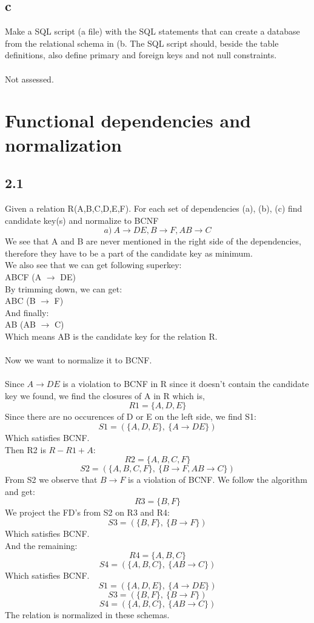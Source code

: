 \documentclass[12pt]{article}
\begin{document}
\subsection*{c}
Make a SQL script (a file) with the SQL statements that can create a database from the relational schema in (b. The SQL script should, beside the table definitions, also define primary and foreign keys and not null constraints.\\
\\
Not assessed.

\section*{Functional dependencies and normalization}
\subsection*{2.1}
Given a relation R(A,B,C,D,E,F). For each set of dependencies (a), (b), (c) find candidate key(s) and normalize to BCNF
$$a)\: A\rightarrow DE, B\rightarrow F, AB\rightarrow C$$
We see that A and B are never mentioned in the right side of the dependencies, therefore they have to be a part of the candidate key as minimum.\\
We also see that we can get following superkey:\\
ABCF (A $\rightarrow$ DE)\\
By trimming down, we can get:\\
ABC (B $\rightarrow$ F)\\
And finally:\\
AB (AB $\rightarrow$ C)\\
Which means AB is the candidate key for the relation R.\\
\\
Now we want to normalize it to BCNF.\\
\\
Since $A\rightarrow DE$ is a violation to BCNF in R since it doesn't contain the candidate key we found, we find the closures of A in R which is,
$$R1=\{A,D,E\}$$
Since there are no occurences of D or E on the left side, we find S1:
$$S1=(\{A,D,E\},\:\{A \rightarrow DE\})$$
Which satisfies BCNF.\\
Then R2 is $R-R1+{A}$:
$$R2=\{A,B,C,F\}$$
$$S2=(\{A,B,C,F\},\:\{B\rightarrow F, AB\rightarrow C\})$$
From S2 we observe that $B\rightarrow F$ is a violation of BCNF. We follow the algorithm and get:
$$R3=\{B,F\}$$
We project the FD's from S2 on R3 and R4:
$$S3=(\{B,F\},\:\{B\rightarrow F\})$$
Which satisfies BCNF.\\
And the remaining:
$$R4=\{A,B,C\}$$
$$S4=(\{A,B,C\},\:\{AB\rightarrow C\})$$
Which satisfies BCNF.
$$S1=(\{A,D,E\},\:\{A \rightarrow DE\})$$
$$S3=(\{B,F\},\:\{B\rightarrow F\})$$
$$S4=(\{A,B,C\},\:\{AB\rightarrow C\})$$
The relation is normalized in these schemas.
\end{document}
